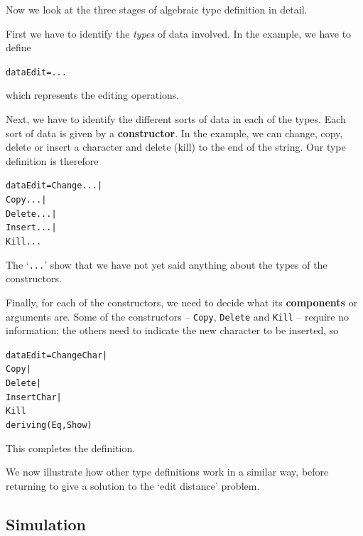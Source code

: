 Now we look at the three stages of algebraic type definition in detail.
\begin{titemize}
\item First we have to identify the {\em types\/} of data involved. In the
example, we have to define
\begin{alltt}
data Edit = ...
\end{alltt}
which represents the editing operations.
\item Next, we have to identify the different sorts of data in each of
the types. Each sort of data is given by a \textbf{constructor}. In the
example, we can change, copy, delete or insert a character and delete (kill)
to the end of the string. Our type definition is therefore
\begin{alltt}
data Edit = Change ... |
            Copy ... |
            Delete ... |
            Insert ... |
            Kill ... 
\end{alltt}
The `\texttt{...}' show that we have not yet said anything about the types of the
constructors. 
\item
Finally, for each of the constructors, we need to decide what its \textbf{components} or arguments are. Some of the constructors -- \texttt{Copy}, 
\texttt{Delete} and \texttt{Kill} -- require no information; the others need to indicate
the new character to be inserted, so
\begin{alltt}
data Edit = Change Char |
            Copy |
            Delete |
            Insert Char |
            Kill  
            deriving (Eq,Show)
\end{alltt}
This completes the definition.
\end{titemize}
We now illustrate how other type definitions work in a similar way,
before returning to give a solution to the `edit distance' problem.

\subsection*{Simulation}
\vspace{3pt}

